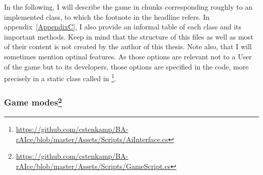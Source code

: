 In the following, I will describe the game in chunks corresponding roughly to an implemented class, to which the footnote in the headline refers. In appendix~\ref{AppendixC}, I also provide an informal table of each class and its important methods. Keep in mind that the structure of this files as well as most of their content is not created by the author of this thesis. Note also, that I will sometimes mention optinal features. As those options are relevant not to a User of the game but to its developers, those options are specified in the code, more precisely in a static class called  in \footnote{\label{aiint} \url{https://github.com/cstenkamp/BA-rAIce/blob/master/Assets/Scripts/AiInterface.cs}}.



\subsubsection{Game modes\footnote{\label{gamescript}\url{https://github.com/cstenkamp/BA-rAIce/blob/master/Assets/Scripts/GameScript.cs}}}

